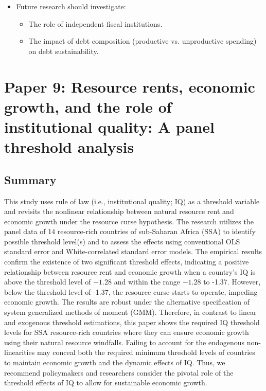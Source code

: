 \documentclass[10pt, oneside]{article}
\begin{document}
\begin{itemize}
\begin{itemize}
		      \item Independent fiscal councils are recommended to complement institutions by mitigating political distortions and overspending.
		      \item Debt composition matters: productive spending (e.g., health, education, infrastructure) supports debt sustainability, whereas unproductive spending undermines it.
	      \end{itemize}
	\item Future research should investigate:
	      \begin{itemize}
		      \item The role of independent fiscal institutions.
		      \item The impact of debt composition (productive vs. unproductive spending) on debt sustainability.
	      \end{itemize}
\end{itemize}

\section{Paper 9: Resource rents, economic growth, and the role of institutional quality: A panel threshold analysis}

\subsection{Summary}

This study uses rule of law (i.e., institutional quality; IQ) as a threshold variable and revisits the nonlinear
relationship between natural resource rent and economic growth under the resource curse hypothesis. The research
utilizes the panel data of 14 resource-rich countries of sub-Saharan Africa (SSA) to identify possible
threshold level(s) and to assess the effects using conventional OLS standard error and White-correlated standard
error models. The empirical results confirm the existence of two significant threshold effects, indicating a positive
relationship between resource rent and economic growth when a country's IQ is above the threshold level
of $-1.28$ and within the range $-1.28$ to -1.37. However, below the threshold level of -1.37, the resource
curse starts to operate, impeding economic growth. The results are robust under the alternative specification of
system generalized methods of moment (GMM). Therefore, in contrast to linear and exogenous threshold estimations,
this paper shows the required IQ threshold levels for SSA resource-rich countries where they can ensure
economic growth using their natural resource windfalls. Failing to account for the endogenous non-linearities
may conceal both the required minimum threshold levels of countries to maintain economic growth and the
dynamic effects of IQ. Thus, we recommend policymakers and researchers consider the pivotal role of the
threshold effects of IQ to allow for sustainable economic growth. \cite{abdulahi2019resource}
\end{document}
